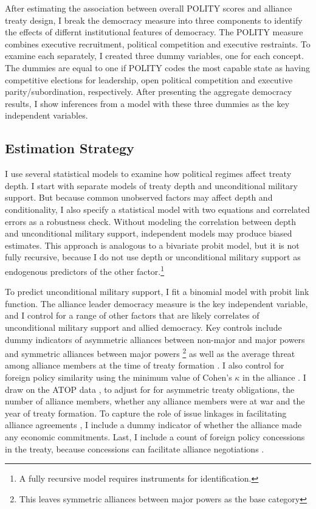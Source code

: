 \documentclass[12pt]{article}
\begin{document}
After estimating the association between overall POLITY scores and alliance treaty design, I break the democracy measure into three components to identify the effects of differnt institutional features of democracy.  
The POLITY measure combines executive recruitment, political competition and executive restraints. 
To examine each separately, I created three dummy variables, one for each concept. 
The dummies are equal to one if POLITY codes the most capable state as having competitive elections for leadership, open political competition and executive parity/subordination, respectively. 
After presenting the aggregate democracy results, I show inferences from a model with these three dummies as the key independent variables.



\subsection{Estimation Strategy}



I use several statistical models to examine how political regimes affect treaty depth. 
I start with separate models of treaty depth and unconditional military support. 
But because common unobserved factors may affect depth and conditionality, I also specify a statistical model with two equations and correlated errors as a robustness check. 
Without modeling the correlation between depth and unconditional military support, independent models may produce biased estimates. 
This approach is analogous to a bivariate probit model, but it is not fully recursive, because I do not use depth or unconditional military support as endogenous predictors of the other factor.\footnote{A fully recursive model requires instruments for identification.}  


To predict unconditional military support, I fit a binomial model with probit link function. 
The alliance leader democracy measure is the key independent variable, and I control for a range of other factors that are likely correlates of unconditional military support and allied democracy. 
Key controls include dummy indicators of asymmetric alliances between non-major and major powers and symmetric alliances between major powers \citep{Mattes2012}\footnote{This leaves symmetric alliances between major powers as the base category} as well as the average threat among alliance members at the time of treaty formation \citep{LeedsSavun2007}. 
I also control for foreign policy similarity \citep{Benson2012} using the minimum value of Cohen's $\kappa$ in the alliance \citep{Hage2011}.
I draw on the ATOP data \citep{Leedsetal2002}, to adjust for for asymmetric treaty obligations, the number of alliance members, whether any alliance members were at war and the year of treaty formation. 
To capture the role of issue linkages in facilitating alliance agreements \citep{Poast2012, Poast2013}, I include a dummy indicator of whether the alliance made any economic commitments.  
Last, I include a count of foreign policy concessions in the treaty, because concessions can facilitate alliance negotiations \citep{Johnson2015}. 
\end{document}
